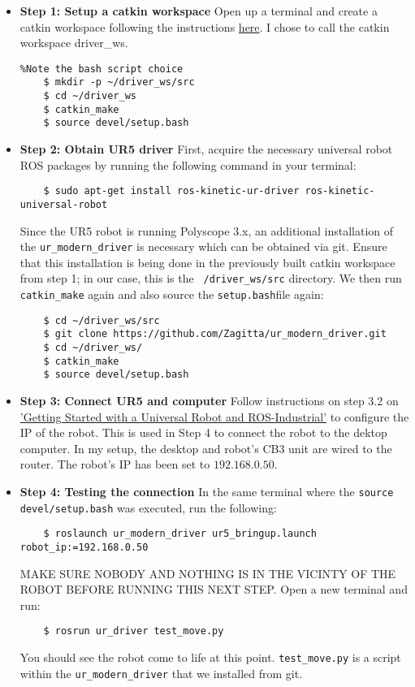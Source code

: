 \documentclass[a4paper]{article}
\begin{document}
\begin{itemize}

  \item {\bf Step 1: Setup a catkin workspace}
    Open up a terminal and create a catkin workspace following
    the instructions
    \href{http://wiki.ros.org/catkin/Tutorials/create_a_workspace}
    {here}. I chose to call the catkin workspace driver\_ws.
    \begin{lstlisting}%Note the bash script choice
    $ mkdir -p ~/driver_ws/src
    $ cd ~/driver_ws
    $ catkin_make
    $ source devel/setup.bash
    \end{lstlisting}
  
  \item{\bf Step 2: Obtain UR5 driver}
    First, acquire the necessary universal robot ROS packages
    by running the following command in your terminal:
    \begin{lstlisting}
    $ sudo apt-get install ros-kinetic-ur-driver ros-kinetic-universal-robot
    \end{lstlisting}
    Since the UR5 robot is running Polyscope 3.x, an additional
    installation of the \texttt{ur\_modern\_driver} is
    necessary which can be obtained via git. Ensure that this
    installation is being done in the previously built
    catkin workspace from step 1; in our case, this is the
    \texttt{~/driver\_ws/src} directory. We then run
    \texttt{catkin\_make} again and also source the
    \texttt{setup.bash}file again:
    \begin{lstlisting}
    $ cd ~/driver_ws/src
    $ git clone https://github.com/Zagitta/ur_modern_driver.git
    $ cd ~/driver_ws/
    $ catkin_make
    $ source devel/setup.bash
    \end{lstlisting}

  \item {\bf Step 3: Connect UR5 and computer}
    Follow instructions on step 3.2 on
    \href{http://wiki.ros.org/universal_robot/Tutorials/Getting%20Started%20with%20a%20Universal%20Robot%20and%20ROS-Industrial}
    {'Getting Started with a Universal Robot and ROS-Industrial'}
    to configure the IP of the robot. This is used in Step 4
    to connect the robot to the dektop computer. In my setup,
    the desktop and robot's CB3 unit are wired to the router.
    The robot's IP has been set to $192.168.0.50$.

  \item{\bf Step 4: Testing the connection}
   In the same terminal where the
    \texttt{source devel/setup.bash} was executed, run the
    following:
    \begin{lstlisting}
    $ roslaunch ur_modern_driver ur5_bringup.launch robot_ip:=192.168.0.50
    \end{lstlisting}
    MAKE SURE NOBODY AND NOTHING IS IN THE VICINTY OF THE ROBOT
    BEFORE RUNNING THIS NEXT STEP. Open a new terminal and run:
    \begin{lstlisting}
    $ rosrun ur_driver test_move.py
    \end{lstlisting}
    You should see the robot come to life at this point.
    \texttt{test\_move.py} is a script within the
    \texttt{ur\_modern\_driver} that we installed from git.
\end{itemize}
\end{document}
